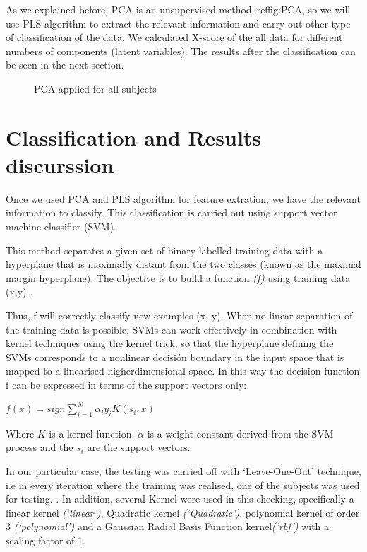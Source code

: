 As we explained before, PCA is an unsupervised method\ ref{fig:PCA}, so we will use PLS algorithm to extract the relevant information and carry out other type of classification of the data. We calculated X-score of the all data for different numbers of components (latent variables). The results after the classification can be seen in the next section.

\begin{figure}[H]
	\centering
	\caption{PCA applied for all subjects}
	\label{fig:PCA}
\end{figure}

\section{Classification and Results discurssion}

Once we used PCA and PLS algorithm for feature extration, we have the relevant information to classify. This classification is carried out using support vector machine classifier (SVM).

This method separates a given set of binary labelled training data with a hyperplane that is maximally distant from the two classes (known as the maximal margin hyperplane). The objective is to build a function \textit{(f)} using training data (x,y) \cite{Gorriz}.
 
Thus, f will correctly classify new examples (x, y). When no linear separation of the training data is possible, SVMs can work effectively in combination with kernel techniques using the kernel trick, so that the hyperplane defining the SVMs corresponds to a nonlinear decisión boundary in the input space that is mapped to a linearised higherdimensional space. In this way the decision function f can be expressed in terms of the support vectors only\cite{Gorriz}:

\begin{center}
	$f(x) = sign{\sum_{i=1}^{N} \alpha_{i}y_{i}K(s_{i},x)}$
\end{center}

Where $K$ is a kernel function, $\alpha$ is a weight constant derived from the SVM process and the $s_{i}$ are the support vectors. 

In our particular case, the testing was carried off with ‘Leave-One-Out’ technique, i.e in every iteration where the training was realised, one of the subjects was used for testing. . In addition, several Kernel were used in this checking, specifically a linear kernel \textit{(‘linear’)}, Quadratic kernel \textit{(‘Quadratic’)}, polynomial kernel of order 3 \textit{(‘polynomial’)} and a Gaussian Radial Basis Function kernel\textit{('rbf')} with a scaling factor of 1.


